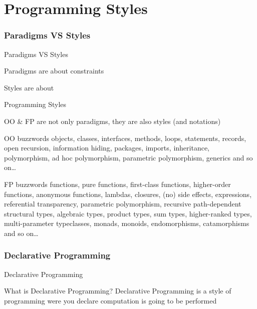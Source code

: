 \part[Programming Styles]{Programming Styles}
\section{Paradigms VS Styles}
\begin{frame}{Paradigms VS Styles}
\begin{center}
Paradigms are about \alert{constraints}
\end{center}
\begin{center}
Styles are about 
\end{center}
\end{frame}

\begin{frame}{Programming Styles}
\begin{center}
OO \& FP are not only paradigms, they are also styles (and notations)
\end{center}
\begin{block}{OO buzzwords}
objects, classes, interfaces, methods, loops, statements, records, open
recursion, information hiding, packages, imports, inheritance, polymorphism, ad
hoc polymorphism, parametric polymorphism, generics and so on\ldots
\end{block}
\begin{block}{FP buzzwords}
functions, pure functions, first-class functions, higher-order functions,
anonymous functions, lambdas, closures, (no) side effects, expressions,
referential transparency, parametric polymorphism, recursive path-dependent structural
types, algebraic types, product types, sum types, higher-ranked types,
multi-parameter typeclasses, monads, monoids, endomorphisms, catamorphisms and
so on\ldots
\end{block}
\end{frame}

\section{Declarative Programming}
\begin{frame}{Declarative Programming}
\begin{block}{What is Declarative Programming?}
Declarative Programming is a style of programming were you declare
 computation is going to be performed
\end{block}
\end{frame}

